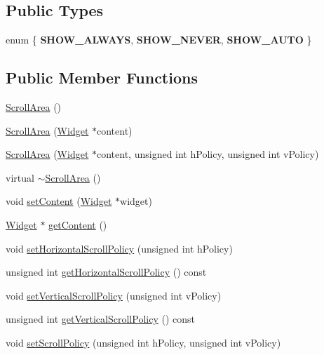 \subsection*{Public Types}
\begin{DoxyCompactItemize}
\item 
enum \{ {\bfseries S\+H\+O\+W\+\_\+\+A\+L\+W\+A\+YS}, 
{\bfseries S\+H\+O\+W\+\_\+\+N\+E\+V\+ER}, 
{\bfseries S\+H\+O\+W\+\_\+\+A\+U\+TO}
 \}
\end{DoxyCompactItemize}
\subsection*{Public Member Functions}
\begin{DoxyCompactItemize}
\item 
\hyperlink{classgcn_1_1ScrollArea_a938e85d49303617f98f28c7e85c25714}{Scroll\+Area} ()
\item 
\hyperlink{classgcn_1_1ScrollArea_afc87f60c06e1fd25f59d967680ef0936}{Scroll\+Area} (\hyperlink{classgcn_1_1Widget}{Widget} $\ast$content)
\item 
\hyperlink{classgcn_1_1ScrollArea_a0d4b64560415267c0c2cce94c8887c38}{Scroll\+Area} (\hyperlink{classgcn_1_1Widget}{Widget} $\ast$content, unsigned int h\+Policy, unsigned int v\+Policy)
\item 
virtual \hyperlink{classgcn_1_1ScrollArea_a5ccf9b8f11f8e38353dde99d5d919acb}{$\sim$\+Scroll\+Area} ()
\item 
void \hyperlink{classgcn_1_1ScrollArea_a519cff8ea4b8c442d37ad549181bb34f}{set\+Content} (\hyperlink{classgcn_1_1Widget}{Widget} $\ast$widget)
\item 
\hyperlink{classgcn_1_1Widget}{Widget} $\ast$ \hyperlink{classgcn_1_1ScrollArea_a03b49754528a1cf4cdbbd5a8dbf0c207}{get\+Content} ()
\item 
void \hyperlink{classgcn_1_1ScrollArea_a602e4aec5b1f73cc3158d415a42fe1f3}{set\+Horizontal\+Scroll\+Policy} (unsigned int h\+Policy)
\item 
unsigned int \hyperlink{classgcn_1_1ScrollArea_aceba741e26fa430f693ff8a700244db1}{get\+Horizontal\+Scroll\+Policy} () const 
\item 
void \hyperlink{classgcn_1_1ScrollArea_ab14b147358b014032d1a0ef03141df37}{set\+Vertical\+Scroll\+Policy} (unsigned int v\+Policy)
\item 
unsigned int \hyperlink{classgcn_1_1ScrollArea_a14d973e27f474dab942261bd7c7d739c}{get\+Vertical\+Scroll\+Policy} () const 
\item 
void \hyperlink{classgcn_1_1ScrollArea_a608515e41cb04f23059c02e28d43ee94}{set\+Scroll\+Policy} (unsigned int h\+Policy, unsigned int v\+Policy)

\end{DoxyCompactItemize}
